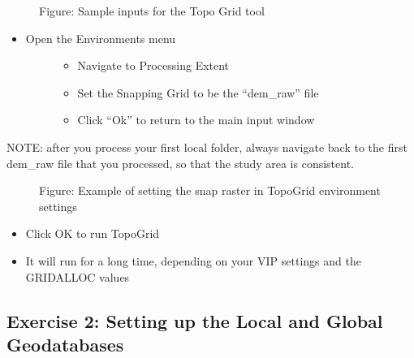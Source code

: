 \documentclass[letterpaper,10pt,english]{sphinxmanual}
\begin{document}
\begin{figure}[htbp]
\centering
\capstart

\noindent{}
\caption{Figure: Sample inputs for the Topo Grid tool}\label{\detokenize{ex_1b:id1}}\end{figure}
\begin{itemize}
\item {} \begin{description}
\item[{Open the Environments menu}] \leavevmode\begin{itemize}
\item {} 
Navigate to Processing Extent

\item {} 
Set the Snapping Grid to be the “dem\_raw” file

\item {} 
Click “Ok” to return to the main input window

\end{itemize}

\end{description}

\end{itemize}

NOTE: after you process your first local folder, always navigate back to the first dem\_raw file that you processed, so that the study area is consistent.

\begin{figure}[htbp]
\centering
\capstart

\noindent{}
\caption{Figure: Example of setting the snap raster in TopoGrid environment settings}\label{\detokenize{ex_1b:id2}}\end{figure}
\begin{itemize}
\item {} 
Click OK to run TopoGrid

\item {} 
It will run for a long time, depending on your VIP settings and the GRIDALLOC values

\end{itemize}


\subsection{Exercise 2: Setting up the Local and Global Geodatabases}
\label{\detokenize{ex_2:exercise-2-setting-up-the-local-and-global-geodatabases}}\label{\detokenize{ex_2::doc}}
\end{document}
